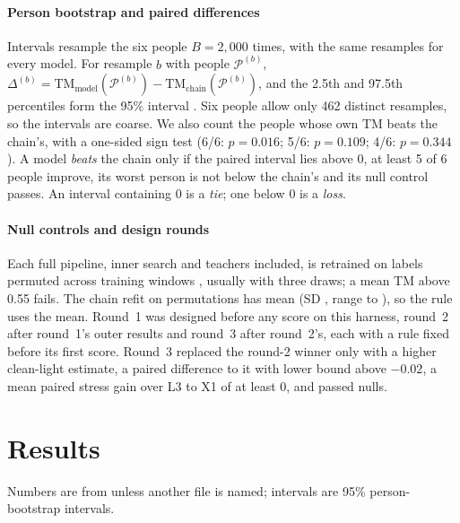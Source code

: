 \documentclass[11pt,letterpaper]{article}
\newcommand{\code}[1]{\texttt{\detokenize{#1}}}
\begin{document}
\paragraph{Person bootstrap and paired differences} Intervals resample the six people $B=2{,}000$ times, with the same resamples for every model. For resample $b$ with people $\mathcal P^{(b)}$, $\Delta^{(b)}=\mathrm{TM}_{\mathrm{model}}(\mathcal P^{(b)})-\mathrm{TM}_{\mathrm{chain}}(\mathcal P^{(b)})$, and the 2.5th and 97.5th percentiles form the 95\% interval \cite{efron1979}. Six people allow only 462 distinct resamples, so the intervals are coarse. We also count the people whose own TM beats the chain's, with a one-sided sign test (6/6: $p=0.016$; 5/6: $p=0.109$; 4/6: $p=0.344$). A model \emph{beats} the chain only if the paired interval lies above 0, at least 5 of 6 people improve, its worst person is not below the chain's and its null control passes. An interval containing 0 is a \emph{tie}; one below 0 is a \emph{loss}.

\paragraph{Null controls and design rounds} Each full pipeline, inner search and teachers included, is retrained on labels permuted across training windows \cite{ojala2010}, usually with three draws; a mean TM above 0.55 fails. The chain refit on \ChainNullN{} permutations has mean \ChainNullMean{} (SD \ChainNullSD{}, range \ChainNullMin{} to \ChainNullMax{}), so the rule uses the mean. Round~1 was designed before any score on this harness, round~2 after round~1's outer results and round~3 after round~2's, each with a rule fixed before its first score. Round~3 replaced the round-2 winner only with a higher clean-light estimate, a paired difference to it with lower bound above $-0.02$, a mean paired stress gain over L3 to X1 of at least 0, and passed nulls.

\section{Results}\label{sec:results}
Numbers are from \code{results/photon/TABLE.csv} unless another file is named; intervals are 95\% person-bootstrap intervals.
\end{document}
